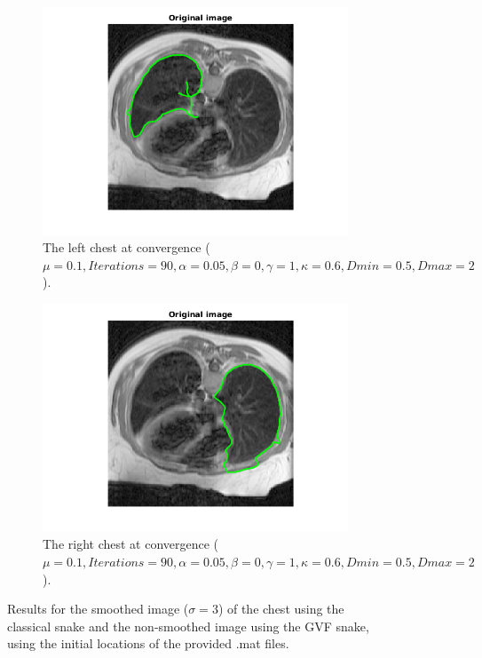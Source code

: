 \documentclass{article}
\begin{document}
\begin{figure}[H]
\begin{subfigure}{0.49\textwidth}
  \centering
  \includegraphics[width=\linewidth]{chestLeftGFV.png}
  \caption{The left chest at convergence ($\mu=0.1, Iterations=90, \alpha=0.05, \beta=0, \gamma=1,\kappa=0.6,Dmin=0.5,Dmax=2$).}
  \label{fig4c}
\end{subfigure}
\begin{subfigure}{0.49\textwidth}
  \centering
  \includegraphics[width=\linewidth]{chestRightGFV.png}
  \caption{The right chest at convergence ($\mu=0.1, Iterations=90, \alpha=0.05, \beta=0, \gamma=1,\kappa=0.6,Dmin=0.5,Dmax=2$).}
  \label{fig4d}
\end{subfigure}
\caption{Results for the smoothed image ($\sigma=3$) of the chest using the classical snake and the non-smoothed image using the GVF snake, using the initial locations of the provided .mat files.}
\label{fig4}
\end{figure}
\end{document}
